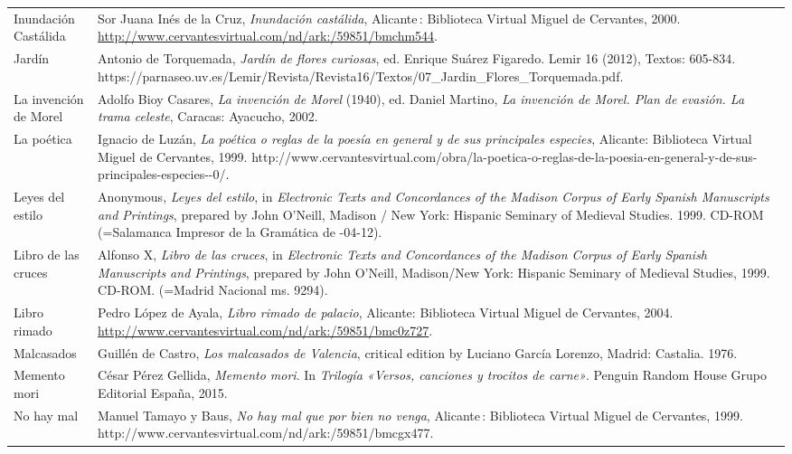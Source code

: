 \documentclass[output=paper]{langscibook}
\begin{document}
\begin{tabularx}{\textwidth}{XX}
Inundación Castálida & Sor Juana Inés de la Cruz, \textit{Inundación castálida}, Alicante : Biblioteca Virtual Miguel de Cervantes, 2000. \url{http://www.cervantesvirtual.com/nd/ark:/59851/bmchm544}.\\
Jardín & Antonio de Torquemada, \textit{Jardín de flores curiosas}, ed. Enrique Suárez Figaredo. Lemir 16 (2012), Textos: 605-834. https://parnaseo.uv.es/Lemir/Revista/Revista16/Textos/07\_Jardin\_Flores\_Torquemada.pdf.\\
La invención de Morel & Adolfo Bioy Casares, \textit{La invención de Morel} (1940), ed. Daniel Martino, \textit{La invención de Morel. Plan de evasión. La trama celeste}, Caracas: Ayacucho, 2002.\\
La poética & Ignacio de Luzán, \textit{La poética o reglas de la poesía en general y de sus principales especies}, Alicante: Biblioteca Virtual Miguel de Cervantes, 1999. http://www.cervantesvirtual.com/obra/la-poetica-o-reglas-de-la-poesia-en-general-y-de-sus-principales-especies-{}-0/.\\
Leyes del estilo & Anonymous, \textit{Leyes del estilo}, in \textit{Electronic Texts and Concordances of the Madison Corpus of Early Spanish Manuscripts and Printings}, prepared by John O’Neill, Madison / New York: Hispanic Seminary of Medieval Studies. 1999. CD-ROM (=Salamanca Impresor de la Gramática de \citealt{Nebrija1500}-04-12).\\
Libro de las cruces & Alfonso X, \textit{Libro de las cruces}, in \textit{Electronic Texts and Concordances of the Madison Corpus of Early Spanish Manuscripts and Printings}, prepared by John O’Neill, Madison/New York: Hispanic Seminary of Medieval Studies, 1999. CD-ROM. (=Madrid Nacional ms. 9294).\\
Libro rimado & Pedro López de Ayala, \textit{Libro rimado de palacio}, Alicante: Biblioteca Virtual Miguel de Cervantes, 2004. \url{http://www.cervantesvirtual.com/nd/ark:/59851/bmc0z727}.\\
Malcasados & Guillén de Castro, \textit{Los malcasados de Valencia}, critical edition by Luciano García Lorenzo, Madrid: Castalia. 1976.\\
Memento mori & César Pérez Gellida, \textit{Memento mori}. In \textit{Trilogía «Versos, canciones y trocitos de carne»}. Penguin Random House Grupo Editorial España, 2015.\\
No hay mal & Manuel Tamayo y Baus, \textit{No hay mal que por bien no venga}, Alicante : Biblioteca Virtual Miguel de Cervantes, 1999. http://www.cervantesvirtual.com/nd/ark:/59851/bmcgx477.\\

\end{tabularx}
\end{document}
